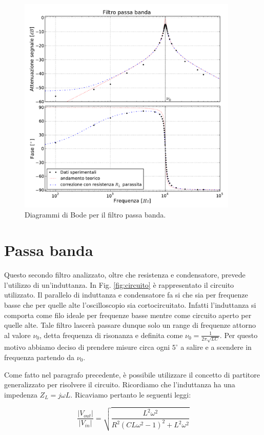 \begin{figure}
    \includegraphics[width=105mm]{bpf.pdf}
    \caption{Diagrammi di Bode per il filtro passa banda.}
    \label{fig:bpf}
\end{figure}

\section{Passa banda}
Questo secondo filtro analizzato, oltre che resistenza e condensatore, prevede l'utilizzo di un'induttanza. In Fig. \ref{fig:circuito} è rappresentato il circuito utilizzato. Il parallelo di induttanza e condensatore fa si che sia per frequenze basse che per quelle alte l'oscilloscopio sia cortocircuitato. Infatti l'induttanza si comporta come filo ideale per frequenze basse mentre come circuito aperto per quelle alte. Tale filtro lascerà passare dunque solo un range di frequenze attorno al valore $\nu_0$, detta frequenza di risonanza e definita come $\nu_0=\frac{1}{2 \pi \sqrt{LC}}$. Per questo motivo abbiamo deciso di prendere misure circa ogni $5^\circ$ a salire e a scendere in frequenza partendo da $\nu_0$.

Come fatto nel paragrafo precedente, è possibile utilizzare il concetto di partitore generalizzato per risolvere il circuito. Ricordiamo che l'induttanza ha una impedenza $Z_L=j\omega L$. Ricaviamo pertanto le seguenti leggi:

\begin{equation}
\frac{|V_{out}|}{|V_{in}|}=\sqrt{\frac{L^2 \omega ^2}{R^2 \left(C L \omega ^2-1\right)^2+L^2 \omega ^2}}
\label{eq:bpfGain}
\end{equation}

